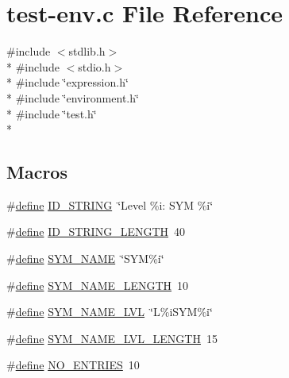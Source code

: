 \hypertarget{test-env_8c}{\section{test-\/env.c File Reference}
\label{test-env_8c}
}
{\ttfamily \#include $<$stdlib.\+h$>$}\\*
{\ttfamily \#include $<$stdio.\+h$>$}\\*
{\ttfamily \#include \char`\"{}expression.\+h\char`\"{}}\\*
{\ttfamily \#include \char`\"{}environment.\+h\char`\"{}}\\*
{\ttfamily \#include \char`\"{}test.\+h\char`\"{}}\\*
\subsection*{Macros}
\begin{DoxyCompactItemize}
\item 
\#\hyperlink{nativefunctions_8h_a06f28a72fd48e4a07d1d9e541bad304a}{define} \hyperlink{test-env_8c_a83f69a8deb29e36caabc38a26d46a102}{I\+D\+\_\+\+S\+T\+R\+I\+N\+G}~\char`\"{}Level \%i\+: S\+Y\+M \%i\char`\"{}
\item 
\#\hyperlink{nativefunctions_8h_a06f28a72fd48e4a07d1d9e541bad304a}{define} \hyperlink{test-env_8c_ac6eaf148a8d3f37958265a8044aee619}{I\+D\+\_\+\+S\+T\+R\+I\+N\+G\+\_\+\+L\+E\+N\+G\+T\+H}~40
\item 
\#\hyperlink{nativefunctions_8h_a06f28a72fd48e4a07d1d9e541bad304a}{define} \hyperlink{test-env_8c_a49da90a28b25c15e6d89b3a1cb6d5a95}{S\+Y\+M\+\_\+\+N\+A\+M\+E}~\char`\"{}S\+Y\+M\%i\char`\"{}
\item 
\#\hyperlink{nativefunctions_8h_a06f28a72fd48e4a07d1d9e541bad304a}{define} \hyperlink{test-env_8c_ab4b1ced0d1496674bda6298e2877fe4a}{S\+Y\+M\+\_\+\+N\+A\+M\+E\+\_\+\+L\+E\+N\+G\+T\+H}~10
\item 
\#\hyperlink{nativefunctions_8h_a06f28a72fd48e4a07d1d9e541bad304a}{define} \hyperlink{test-env_8c_a65731c3dc6173d6e0887617da97a77da}{S\+Y\+M\+\_\+\+N\+A\+M\+E\+\_\+\+L\+V\+L}~\char`\"{}L\%i\+S\+Y\+M\%i\char`\"{}
\item 
\#\hyperlink{nativefunctions_8h_a06f28a72fd48e4a07d1d9e541bad304a}{define} \hyperlink{test-env_8c_a1eeb38016f478f76f85c6d3915da2a9d}{S\+Y\+M\+\_\+\+N\+A\+M\+E\+\_\+\+L\+V\+L\+\_\+\+L\+E\+N\+G\+T\+H}~15
\item 
\#\hyperlink{nativefunctions_8h_a06f28a72fd48e4a07d1d9e541bad304a}{define} \hyperlink{test-env_8c_a36ee53633d95184eac6b2f76e2e8bae3}{N\+O\+\_\+\+E\+N\+T\+R\+I\+E\+S}~10
\end{DoxyCompactItemize}
